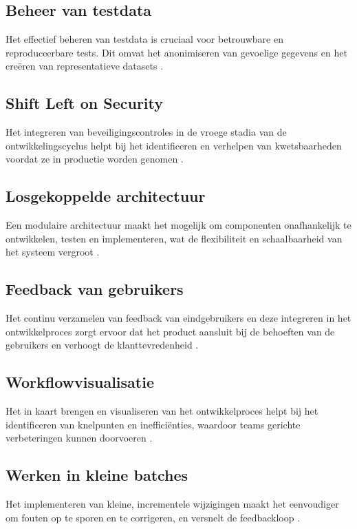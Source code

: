 \subsection{Beheer van testdata}
Het effectief beheren van testdata is cruciaal voor betrouwbare en reproduceerbare tests. Dit omvat het anonimiseren van gevoelige gegevens en het creëren van representatieve datasets \autocite{shahin2017}.

\subsection{Shift Left on Security}
Het integreren van beveiligingscontroles in de vroege stadia van de ontwikkelingscyclus helpt bij het identificeren en verhelpen van kwetsbaarheden voordat ze in productie worden genomen \autocite{forsgren2018}.

\subsection{Losgekoppelde architectuur}
Een modulaire architectuur maakt het mogelijk om componenten onafhankelijk te ontwikkelen, testen en implementeren, wat de flexibiliteit en schaalbaarheid van het systeem vergroot \autocite{shahin2017}.

\subsection{Feedback van gebruikers}
Het continu verzamelen van feedback van eindgebruikers en deze integreren in het ontwikkelproces zorgt ervoor dat het product aansluit bij de behoeften van de gebruikers en verhoogt de klanttevredenheid \autocite{forsgren2018}.

\subsection{Workflowvisualisatie}
Het in kaart brengen en visualiseren van het ontwikkelproces helpt bij het identificeren van knelpunten en inefficiënties, waardoor teams gerichte verbeteringen kunnen doorvoeren \autocite{shahin2017}.

\subsection{Werken in kleine batches}
Het implementeren van kleine, incrementele wijzigingen maakt het eenvoudiger om fouten op te sporen en te corrigeren, en versnelt de feedbackloop \autocite{forsgren2018}.

